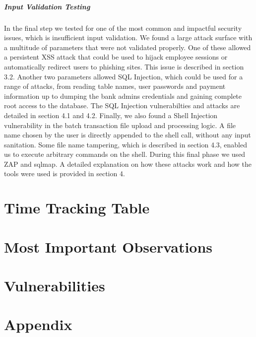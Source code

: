 \documentclass{report}
\begin{document}
\subsubsection{Input Validation Testing}
In the final step we tested for one of the most common and impactful security issues, which is insufficient input validation. We found a large attack surface with a multitude of parameters that were not validated properly. One of these allowed a persistent XSS attack that could be used to hijack employee sessions or automatically redirect users to phishing sites. This issue is described in section 3.2. Another two parameters allowed SQL Injection, which could be used for a range of attacks, from reading table names, user passwords and payment information up to dumping the bank admins credentials and gaining complete root access to the database. The SQL Injection vulnerabilties and attacks are detailed in section 4.1 and 4.2. Finally, we also found a Shell Injection vulnerability in the batch transaction file upload and processing logic. A file name chosen by the user is directly appended to the shell call, without any input sanitation. Some file name tampering, which is described in section 4.3, enabled us to execute arbitrary commands on the shell. During this final phase we used ZAP and sqlmap. A detailed explanation on how these attacks work and how the tools were used is provided in section 4.
\tableofcontents

\part{Time Tracking Table}


\part{Most Important Observations}


\part{Vulnerabilities}




\part*{Appendix}
\appendix

\end{document}
